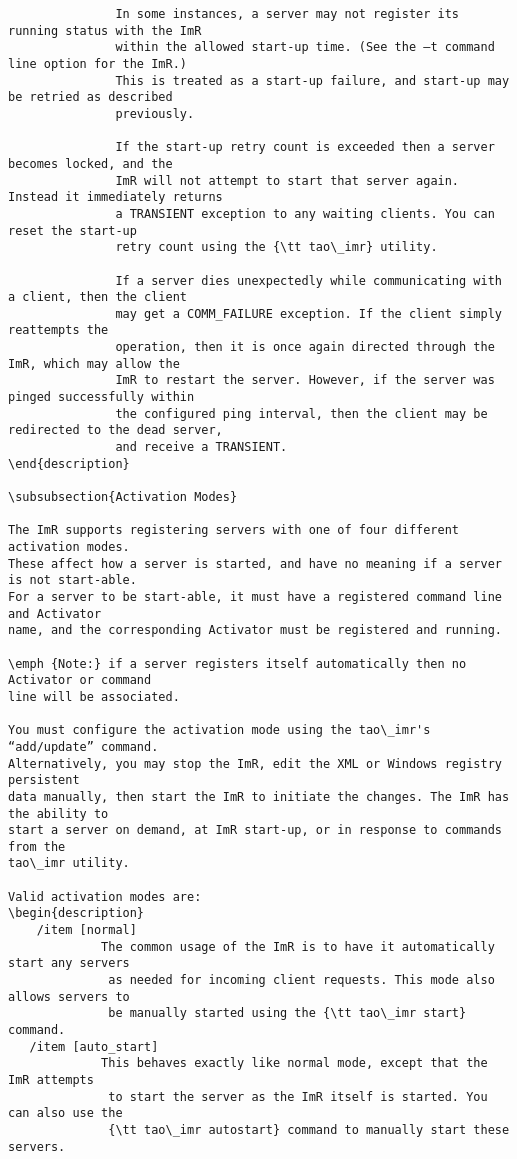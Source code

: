 \begin{itemize}
{\begin{itemize}
{{\begin{itemize}
\begin{verbatim}
               In some instances, a server may not register its running status with the ImR 
               within the allowed start-up time. (See the –t command line option for the ImR.)
               This is treated as a start-up failure, and start-up may be retried as described 
               previously. 

               If the start-up retry count is exceeded then a server becomes locked, and the 
               ImR will not attempt to start that server again. Instead it immediately returns 
               a TRANSIENT exception to any waiting clients. You can reset the start-up 
               retry count using the {\tt tao\_imr} utility.

               If a server dies unexpectedly while communicating with a client, then the client 
               may get a COMM_FAILURE exception. If the client simply reattempts the 
               operation, then it is once again directed through the ImR, which may allow the 
               ImR to restart the server. However, if the server was pinged successfully within 
               the configured ping interval, then the client may be redirected to the dead server, 
               and receive a TRANSIENT. 
\end{description}

\subsubsection{Activation Modes}

The ImR supports registering servers with one of four different activation modes. 
These affect how a server is started, and have no meaning if a server is not start-able. 
For a server to be start-able, it must have a registered command line and Activator 
name, and the corresponding Activator must be registered and running.

\emph {Note:} if a server registers itself automatically then no Activator or command 
line will be associated.

You must configure the activation mode using the tao\_imr's “add/update” command. 
Alternatively, you may stop the ImR, edit the XML or Windows registry persistent 
data manually, then start the ImR to initiate the changes. The ImR has the ability to 
start a server on demand, at ImR start-up, or in response to commands from the 
tao\_imr utility.

Valid activation modes are: 
\begin{description}
    /item [normal]
             The common usage of the ImR is to have it automatically start any servers 
              as needed for incoming client requests. This mode also allows servers to 
              be manually started using the {\tt tao\_imr start} command.
   /item [auto_start]
             This behaves exactly like normal mode, except that the ImR attempts 
              to start the server as the ImR itself is started. You can also use the 
              {\tt tao\_imr autostart} command to manually start these servers.


\end{verbatim}
\end{itemize}}}
\end{itemize}}
\end{itemize}
